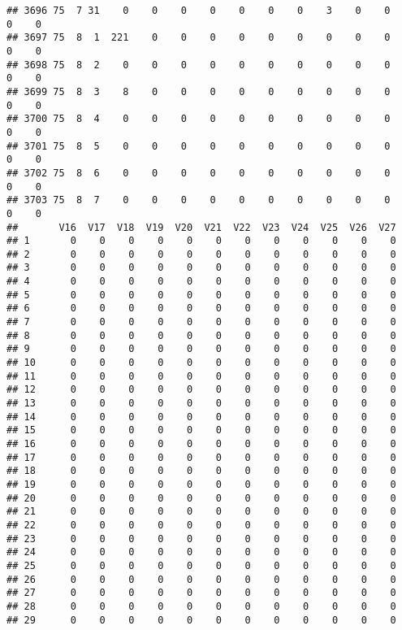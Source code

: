 \documentclass[]{article}
\begin{document}
\begin{verbatim}
## 3696 75  7 31    0    0    0    0    0    0    0    3    0    0    0    0
## 3697 75  8  1  221    0    0    0    0    0    0    0    0    0    0    0
## 3698 75  8  2    0    0    0    0    0    0    0    0    0    0    0    0
## 3699 75  8  3    8    0    0    0    0    0    0    0    0    0    0    0
## 3700 75  8  4    0    0    0    0    0    0    0    0    0    0    0    0
## 3701 75  8  5    0    0    0    0    0    0    0    0    0    0    0    0
## 3702 75  8  6    0    0    0    0    0    0    0    0    0    0    0    0
## 3703 75  8  7    0    0    0    0    0    0    0    0    0    0    0    0
##       V16  V17  V18  V19  V20  V21  V22  V23  V24  V25  V26  V27
## 1       0    0    0    0    0    0    0    0    0    0    0    0
## 2       0    0    0    0    0    0    0    0    0    0    0    0
## 3       0    0    0    0    0    0    0    0    0    0    0    0
## 4       0    0    0    0    0    0    0    0    0    0    0    0
## 5       0    0    0    0    0    0    0    0    0    0    0    0
## 6       0    0    0    0    0    0    0    0    0    0    0    0
## 7       0    0    0    0    0    0    0    0    0    0    0    0
## 8       0    0    0    0    0    0    0    0    0    0    0    0
## 9       0    0    0    0    0    0    0    0    0    0    0    0
## 10      0    0    0    0    0    0    0    0    0    0    0    0
## 11      0    0    0    0    0    0    0    0    0    0    0    0
## 12      0    0    0    0    0    0    0    0    0    0    0    0
## 13      0    0    0    0    0    0    0    0    0    0    0    0
## 14      0    0    0    0    0    0    0    0    0    0    0    0
## 15      0    0    0    0    0    0    0    0    0    0    0    0
## 16      0    0    0    0    0    0    0    0    0    0    0    0
## 17      0    0    0    0    0    0    0    0    0    0    0    0
## 18      0    0    0    0    0    0    0    0    0    0    0    0
## 19      0    0    0    0    0    0    0    0    0    0    0    0
## 20      0    0    0    0    0    0    0    0    0    0    0    0
## 21      0    0    0    0    0    0    0    0    0    0    0    0
## 22      0    0    0    0    0    0    0    0    0    0    0    0
## 23      0    0    0    0    0    0    0    0    0    0    0    0
## 24      0    0    0    0    0    0    0    0    0    0    0    0
## 25      0    0    0    0    0    0    0    0    0    0    0    0
## 26      0    0    0    0    0    0    0    0    0    0    0    0
## 27      0    0    0    0    0    0    0    0    0    0    0    0
## 28      0    0    0    0    0    0    0    0    0    0    0    0
## 29      0    0    0    0    0    0    0    0    0    0    0    0

\end{verbatim}
\end{document}
